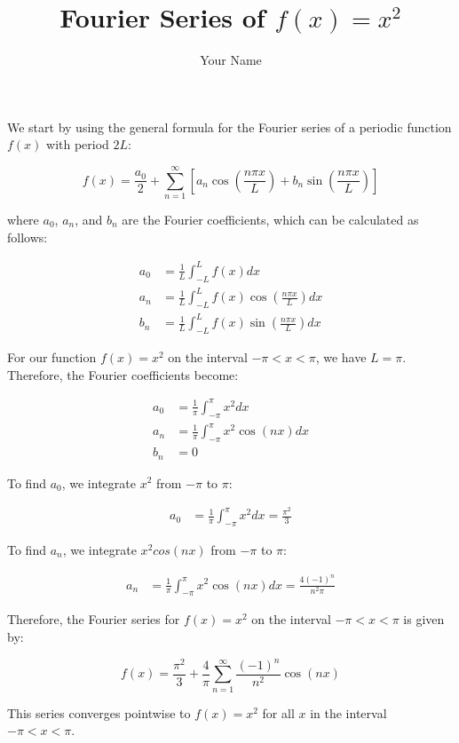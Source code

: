 \documentclass{article}
\begin{document}
  
  \title{Fourier Series of $f(x) = x^2$}
  \author{Your Name}
  
  \maketitle
  
  We start by using the general formula for the Fourier series of a periodic function $f(x)$ with period $2L$:
  
  \begin{equation*}
  f(x) = \frac{a_0}{2} + \sum_{n=1}^{\infty} [a_n \cos(\frac{n\pi x}{L}) + b_n \sin(\frac{n\pi x}{L})]
  \end{equation*}
  
  where $a_0$, $a_n$, and $b_n$ are the Fourier coefficients, which can be calculated as follows:
  
  \begin{align*}
  a_0 &= \frac{1}{L} \int_{-L}^{L} f(x) dx \\
  a_n &= \frac{1}{L} \int_{-L}^{L} f(x) \cos(\frac{n\pi x}{L}) dx \\
  b_n &= \frac{1}{L} \int_{-L}^{L} f(x) \sin(\frac{n\pi x}{L}) dx
  \end{align*}
  
  For our function $f(x) = x^2$ on the interval $-\pi<x<\pi$, we have $L = \pi$. Therefore, the Fourier coefficients become:
  
  \begin{align*}
  a_0 &= \frac{1}{\pi} \int_{-\pi}^{\pi} x^2 dx \\
  a_n &= \frac{1}{\pi} \int_{-\pi}^{\pi} x^2 \cos(nx) dx \\
  b_n &= 0
  \end{align*}
  
  To find $a_0$, we integrate $x^2$ from $-\pi$ to $\pi$:
  
  \begin{align*}
  a_0 &= \frac{1}{\pi} \int_{-\pi}^{\pi} x^2 dx = \frac{\pi^2}{3}
  \end{align*}
  
  To find $a_n$, we integrate $x^2 cos(nx)$ from $-\pi$ to $\pi$:
  
  \begin{align*}
  a_n &= \frac{1}{\pi} \int_{-\pi}^{\pi} x^2 \cos(nx) dx = \frac{4(-1)^n}{n^2\pi}
  \end{align*}
  
  Therefore, the Fourier series for $f(x) = x^2$ on the interval $-\pi<x<\pi$ is given by:
  
  \begin{equation*}
  f(x) = \frac{\pi^2}{3} + \frac{4}{\pi} \sum_{n=1}^{\infty} \frac{(-1)^n}{n^2} \cos(nx)
  \end{equation*}
  
  This series converges pointwise to $f(x) = x^2$ for all $x$ in the interval $-\pi<x<\pi$.
  
  
\end{document}
